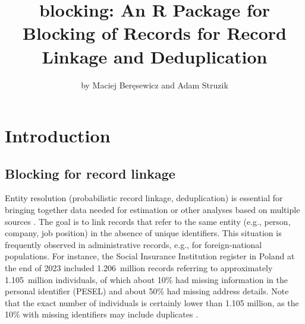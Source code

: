 \title{blocking: An R Package for Blocking of Records for Record Linkage and Deduplication}


\author{by Maciej Beręsewicz and Adam Struzik}

\maketitle


\section{Introduction}\label{introduction}

\subsection{Blocking for record linkage}\label{blocking-for-record-linkage}

Entity resolution (probabilistic record linkage, deduplication) is
essential for bringing together data needed for estimation or other
analyses based on multiple sources \citep[cf.~][]{fellegi1969theory, Binette2022}. The goal is to link records that refer to the same entity
(e.g., person, company, job position) in the absence of unique
identifiers. This situation is frequently observed in administrative
records, e.g., for foreign-national populations. For instance, the
Social Insurance Institution register in Poland at the end of 2023
included 1.206~million records referring to approximately 1.105~million
individuals, of which about 10\% had missing information in the personal
identifier (PESEL) and about 50\% had missing address details. Note that
the exact number of individuals is certainly lower than 1.105 million,
as the 10\% with missing identifiers may include duplicates
\citep[cf.~][]{beresewicz2025estimation}.


